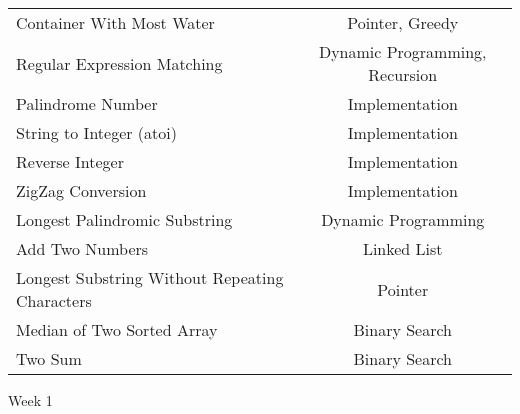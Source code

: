 \documentclass[paper=a4, fontsize=11pt]{scrartcl} %
\begin{document}
\begin{center}
\begin{longtable}{|l|c|}
    Container With Most Water   &   Pointer, Greedy\\
    Regular Expression Matching &   Dynamic Programming, Recursion  \\
    Palindrome Number   &   Implementation \\
    String to Integer (atoi)    &   Implementation  \\
    Reverse Integer &   Implementation \\
    ZigZag Conversion   &  Implementation  \\
    Longest Palindromic Substring   &   Dynamic Programming \\
    Add Two Numbers &   Linked List \\
    Longest Substring Without Repeating Characters  &   Pointer  \\
    Median of Two Sorted Array  &   Binary Search   \\
    Two Sum &      Binary Search    \\
    \hline

  \end{longtable}

  \pagebreak

  \begin{center}
    Week 1
  \end{center}
  \vspace{5mm}


\end{center}
\end{document}
